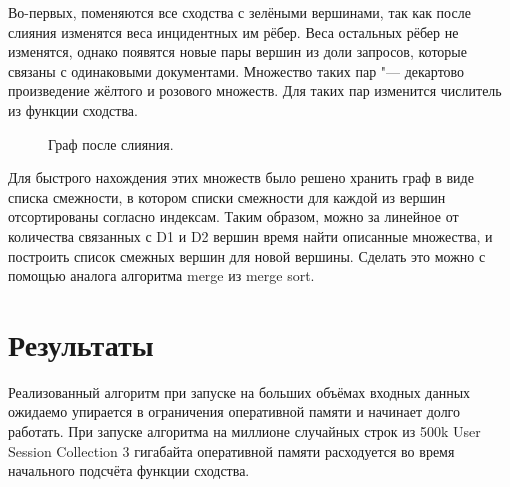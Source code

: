 \documentclass{article}
\begin{document}
Во-первых, поменяются все сходства с зелёными вершинами, так как после слияния изменятся веса инцидентных им рёбер.
Веса остальных рёбер не изменятся, однако появятся новые пары вершин из доли запросов, которые связаны с одинаковыми документами.
Множество таких пар "--- декартово произведение жёлтого и розового множеств.
Для таких пар изменится числитель из функции сходства.

\begin{figure}[h]
    \centering
    \caption{Граф после слияния.}
    \label{diagram}
\end{figure}

Для быстрого нахождения этих множеств было решено хранить граф в виде списка смежности,
в котором списки смежности для каждой из вершин отсортированы согласно индексам.
Таким образом, можно за линейное от количества связанных с D1 и D2 вершин время найти описанные множества,
и построить список смежных вершин для новой вершины.
Сделать это можно с помощью аналога алгоритма merge из merge sort.

\section{\texorpdfstring{Результаты}{Results}}
Реализованный алгоритм при запуске на больших объёмах входных данных
ожидаемо упирается в ограничения оперативной памяти и начинает долго работать.
При запуске алгоритма на миллионе случайных строк из 500k User Session Collection
3 гигабайта оперативной памяти расходуется во время начального подсчёта функции сходства.
\end{document}
